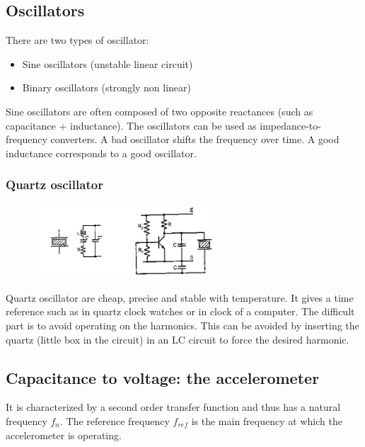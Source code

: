 \subsection{Oscillators}

There are two types of oscillator:

\begin{itemize}
    \item Sine oscillators (unstable linear circuit)
    \item Binary oscillators (strongly non linear)
\end{itemize}
Sine oscillators are often composed of two
opposite reactances (such as capacitance +
inductance).
The oscillators can be used as impedance-to-frequency converters. 
A bad oscillator shifts the frequency over time. A good inductance corresponds to a good oscillator.

\subsubsection{Quartz oscillator}

\begin{figure}[H]
    \centering
    \includegraphics[width = 0.6\textwidth]{L4/img/quartz-oscillator.PNG}
\end{figure}

Quartz oscillator are cheap, precise and stable with temperature. It gives a time reference such as in quartz clock watches or in clock of a computer.
The difficult part is to avoid operating on the harmonics.
This can be avoided by inserting the quartz (little box in the circuit) in an LC circuit to force the desired harmonic. 

\subsection{Capacitance to voltage: the accelerometer}

It is characterized by a second order transfer function and thus has a natural frequency $f_n$. The reference frequency $f_{ref}$ is the main frequency at which the accelerometer is operating.
